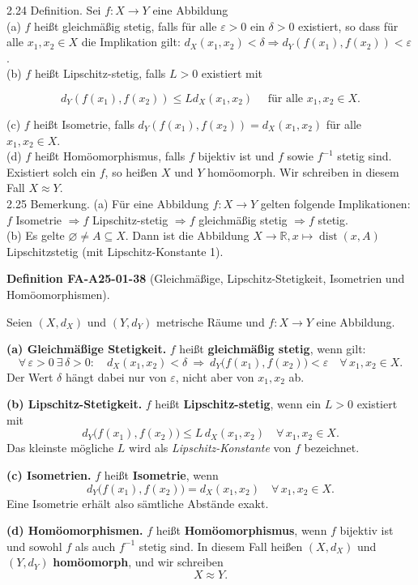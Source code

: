 \documentclass[10pt, letterpaper]{article}
\newcommand{\CustomHeading}[3]{%
  \par\medskip\noindent%
  \textbf{#1 #2} \textnormal{(#3)}.\enskip%
}
\newenvironment{DEF}[2]{\begin{unitbox}\CustomHeading{Definition}{#1}{#2}}{\end{unitbox}}
\begin{document}
2.24 Definition. Sei $f: X \rightarrow Y$ eine Abbildung\\
(a) $f$ heißt gleichmäßig stetig, falls für alle $\varepsilon>0$ ein $\delta>0$ existiert, so dass für alle $x_{1}, x_{2} \in X$ die Implikation gilt: $d_{X}\left(x_{1}, x_{2}\right)<\delta \Longrightarrow d_{Y}\left(f\left(x_{1}\right), f\left(x_{2}\right)\right)<\varepsilon$.\\
(b) $f$ heißt Lipschitz-stetig, falls $L>0$ existiert mit

$$
d_{Y}\left(f\left(x_{1}\right), f\left(x_{2}\right)\right) \leq L d_{X}\left(x_{1}, x_{2}\right) \quad \text { für alle } x_{1}, x_{2} \in X .
$$

(c) $f$ heißt Isometrie, falls $d_{Y}\left(f\left(x_{1}\right), f\left(x_{2}\right)\right)=d_{X}\left(x_{1}, x_{2}\right)$ für alle $x_{1}, x_{2} \in X$.\\
(d) $f$ heißt Homöomorphismus, falls $f$ bijektiv ist und $f$ sowie $f^{-1}$ stetig sind. Existiert solch ein $f$, so heißen $X$ und $Y$ homöomorph. Wir schreiben in diesem Fall $X \approx Y$.\\
2.25 Bemerkung. (a) Für eine Abbildung $f: X \rightarrow Y$ gelten folgende Implikationen: $f$ Isometrie $\Longrightarrow f$ Lipschitz-stetig $\Longrightarrow f$ gleichmäßig stetig $\Longrightarrow f$ stetig.\\
(b) Es gelte $\varnothing \neq A \subseteq X$. Dann ist die Abbildung $X \rightarrow \mathbb{R}, x \mapsto \operatorname{dist}(x, A)$ Lipschitzstetig (mit Lipschitz-Konstante 1).



\begin{DEF}{FA-A25-01-38}{Gleichmäßige, Lipschitz-Stetigkeit, Isometrien und Homöomorphismen}
Seien $(X,d_X)$ und $(Y,d_Y)$ metrische Räume und $f:X\to Y$ eine Abbildung.

\textbf{(a) Gleichmäßige Stetigkeit.}  
$f$ heißt \textbf{gleichmäßig stetig}, wenn gilt:
\[
\forall\,\varepsilon>0\ \exists\,\delta>0:\quad 
d_X(x_1,x_2)<\delta \ \Rightarrow\ d_Y\big(f(x_1),f(x_2)\big)<\varepsilon
\quad\forall\,x_1,x_2\in X.
\]
Der Wert $\delta$ hängt dabei nur von $\varepsilon$, nicht aber von $x_1,x_2$ ab.

\textbf{(b) Lipschitz-Stetigkeit.}  
$f$ heißt \textbf{Lipschitz-stetig}, wenn ein $L>0$ existiert mit
\[
d_Y\big(f(x_1),f(x_2)\big)\le L\, d_X(x_1,x_2)
\quad\forall\,x_1,x_2\in X.
\]
Das kleinste mögliche $L$ wird als \emph{Lipschitz-Konstante} von $f$ bezeichnet.

\textbf{(c) Isometrien.}  
$f$ heißt \textbf{Isometrie}, wenn
\[
d_Y\big(f(x_1),f(x_2)\big)=d_X(x_1,x_2)
\quad\forall\,x_1,x_2\in X.
\]
Eine Isometrie erhält also sämtliche Abstände exakt.

\textbf{(d) Homöomorphismen.}  
$f$ heißt \textbf{Homöomorphismus}, wenn $f$ bijektiv ist und sowohl $f$ als auch $f^{-1}$ stetig sind.  
In diesem Fall heißen $(X,d_X)$ und $(Y,d_Y)$ \textbf{homöomorph}, und wir schreiben
\[
X \approx Y.
\]
\end{DEF}
\end{document}
